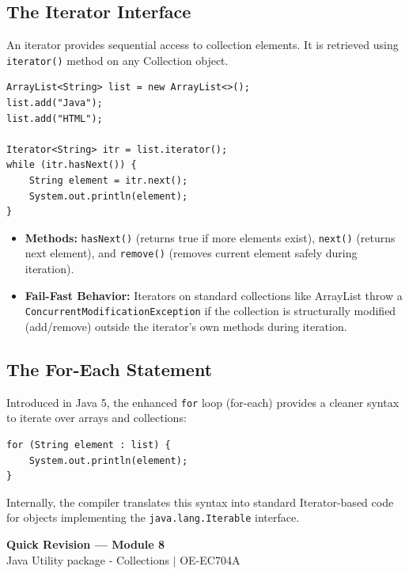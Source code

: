 \documentclass[12pt,a4paper]{article}
\begin{document}
\subsection{The Iterator Interface}
An iterator provides sequential access to collection elements. It is retrieved using \texttt{iterator()} method on any Collection object.
\begin{verbatim}
ArrayList<String> list = new ArrayList<>();
list.add("Java");
list.add("HTML");

Iterator<String> itr = list.iterator();
while (itr.hasNext()) {
    String element = itr.next();
    System.out.println(element);
}
\end{verbatim}
\begin{itemize}[leftmargin=*, itemsep=3.5pt]
  \item \textbf{Methods:} \texttt{hasNext()} (returns true if more elements exist), \texttt{next()} (returns next element), and \texttt{remove()} (removes current element safely during iteration).
  \item \textbf{Fail-Fast Behavior:} Iterators on standard collections like ArrayList throw a \texttt{ConcurrentModificationException} if the collection is structurally modified (add/remove) outside the iterator's own methods during iteration.
\end{itemize}

\subsection{The For-Each Statement}
Introduced in Java 5, the enhanced \texttt{for} loop (for-each) provides a cleaner syntax to iterate over arrays and collections:
\begin{verbatim}
for (String element : list) {
    System.out.println(element);
}
\end{verbatim}
Internally, the compiler translates this syntax into standard Iterator-based code for objects implementing the \texttt{java.lang.Iterable} interface.

\newpage
\begin{center}
  {\large\bfseries\color{myred} Quick Revision --- Module 8}\\[3pt]
  {\small\color{mydark} Java Utility package - Collections $|$ OE-EC704A}
\end{center}
\noindent{\color{myred}\rule{\linewidth}{1.2pt}}
\vspace{4pt}
\end{document}
